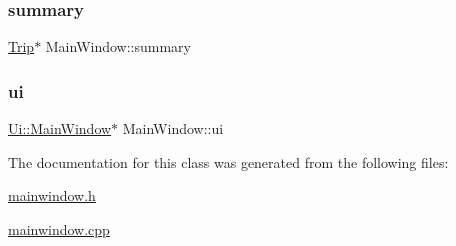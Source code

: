 \subsubsection{\texorpdfstring{summary}{summary}}
{\footnotesize\ttfamily \hyperlink{class_trip}{Trip}$\ast$ Main\+Window\+::summary\hspace{0.3cm}{\ttfamily [private]}}

\mbox{\label{class_main_window_a35466a70ed47252a0191168126a352a5}} 
\subsubsection{\texorpdfstring{ui}{ui}}
{\footnotesize\ttfamily \hyperlink{class_ui_1_1_main_window}{Ui\+::\+Main\+Window}$\ast$ Main\+Window\+::ui\hspace{0.3cm}{\ttfamily [private]}}



The documentation for this class was generated from the following files\+:\begin{DoxyCompactItemize}
\item 
\hyperlink{mainwindow_8h}{mainwindow.\+h}\item 
\hyperlink{mainwindow_8cpp}{mainwindow.\+cpp}\end{DoxyCompactItemize}
